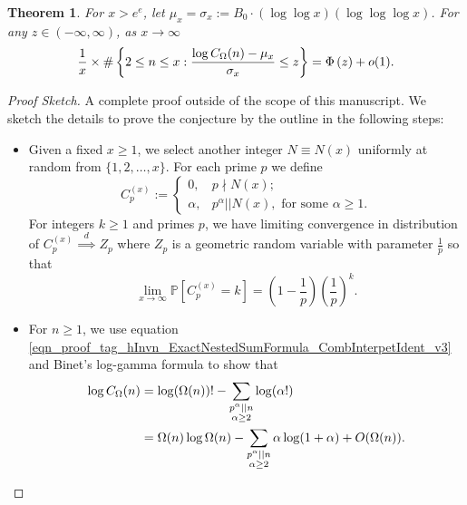 \documentclass[11pt,reqno,a4letter]{article}
\numberwithin{equation}{section}
\numberwithin{figure}{section}
\numberwithin{table}{section}
\let\citep\cite
\theoremstyle{plain}
\newtheorem{theorem}{Theorem}
\numberwithin{theorem}{section}
\theoremstyle{definition}
\begin{document}
\begin{theorem}
\label{conj_DetFormOfEKTypeThmForCOmegan_v1} 
For $x > e^e$, let $\mu_x = \sigma_x := B_0 \cdot (\log\log x)(\log\log\log x)$.
For any $z \in (-\infty, \infty)$, as $x \rightarrow \infty$ 
\begin{equation} 
\notag
\frac{1}{x} \times 
	\#\left\{2 \leq n \leq x: \frac{\log C_{\Omega}(n) - \mu_x}{\sigma_x} \leq z\right\} = 
        \Phi\left(z\right) + o(1). 
\end{equation}
\end{theorem} 
\begin{proof}[Proof Sketch]
A complete proof outside of the scope of this manuscript. 
We sketch the details to prove 
the conjecture by the outline in the following steps: 
\begin{itemize}[noitemsep,topsep=0pt,leftmargin=0.23in]
\item
Given a fixed $x \geq 1$, we select another integer $N \equiv N(x)$ uniformly at random from 
$\{1,2,\ldots,x\}$. For each prime $p$ we define 
\[
C_p^{(x)} := \begin{cases} 0, & p \nmid N(x); \\ 
	\alpha, & p^{\alpha} || N(x), \text{ for some } \alpha \geq 1. 
	\end{cases}
\]
For integers $k \geq 1$ and primes $p$, we have limiting convergence in distribution of 
$C_p^{(x)} \overset{d}{\implies} Z_p$ where $Z_p$ is 
a geometric random variable with parameter $\frac{1}{p}$ so that 
\citep[\S 1.2]{LOG-COMB-STRUCTS-BOOK} 
\[
\lim_{x \rightarrow \infty} \mathbb{P}\left[C_p^{(x)} = k\right] = 
     \left(1 - \frac{1}{p}\right)\left(\frac{1}{p}\right)^k. 
\]
\item 
For $n \geq 1$, we use 
equation \eqref{eqn_proof_tag_hInvn_ExactNestedSumFormula_CombInterpetIdent_v3} and 
Binet's log-gamma formula \cite[\S 5.9(i)]{NISTHB} to show that 
\begin{align}
\notag
\log C_{\Omega}(n) & = \log (\Omega(n))! - 
	\sum_{\substack{p^{\alpha}||n \\ \alpha \geq 2}} \log(\alpha!) \\ 
\label{eqn_remark_LogCOmegan_IntermedExp_v1}
	& = \Omega(n) \log \Omega(n) - \sum_{\substack{p^{\alpha}||n \\ \alpha \geq 2}} 
	\alpha \log(1 + \alpha) + O(\Omega(n)). 
\end{align}

\end{itemize}
\end{proof}
\end{document}
